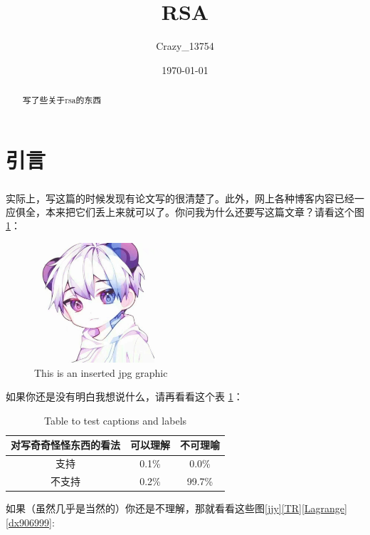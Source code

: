 \documentclass[a4paper]{article}  %
\title{\heiti\zihao{2} RSA}
\author{\songti Crazy\_13754}
\date{\today}
\newcommand{\upcite}[1]{\textsuperscript{\textsuperscript{\cite{#1}}}} %
\begin{document}
\maketitle
\begin{abstract}
	写了些关于rsa的东西
\end{abstract}
\tableofcontents
\section[引言]{引言}

实际上，写这篇的时候发现有论文写的很清楚了\upcite{chenchuanbo2006rsa}。此外，网上各种博客内容已经一应俱全，本来把它们丢上来就可以了。你问我为什么还要写这篇文章？请看这个图 \ref{fig:rsa1}：

\begin{figure}[htbp]
	\centering
	\includegraphics[width=1.77in,height=1.75in]{contents/rsa1.jpg}
	\caption{This is an inserted jpg graphic}
	\label{fig:rsa1}
\end{figure}

如果你还是没有明白我想说什么，请再看看这个表 \ref{table:1}：

\begin{table}[h!]
	\centering
	\begin{tabular}{ c c c }
		\hline
		对写奇奇怪怪东西的看法 & 可以理解  & 不可理喻   \\
		\hline
		支持          & 0.1\% & 0.0\%  \\
		不支持         & 0.2\% & 99.7\% \\
		\hline
	\end{tabular}
	\caption{Table to test captions and labels}
	\label{table:1}
\end{table}

如果（虽然几乎是当然的）你还是不理解，那就看看这些图\ref{jjy}\ref{TR}\ref{Lagrange}\ref{dx906999}:
\end{document}
